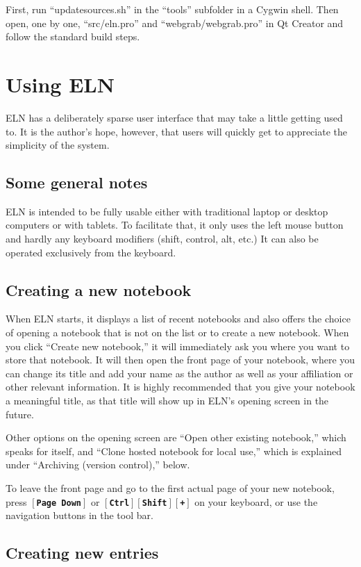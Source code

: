 \documentclass[11pt]{report}
\def\keystroke#1{$\left[\right.\!${\tt\bfseries #1}$\!\left.\right]$}
\def\key#1{\keystroke{#1}}
\def\controlshift#1{\keystroke{Ctrl}\keystroke{Shift}\keystroke{#1}}
\begin{document}
First, run ``updatesources.sh'' in the
``tools'' subfolder in a Cygwin shell. Then open, one by one, ``src/eln.pro''
and ``webgrab/webgrab.pro'' in Qt
Creator and follow the standard build steps.

\chapter{Using ELN}

ELN has a deliberately sparse user interface that may take a little
getting used to. It is the author's hope, however, that users will
quickly get to appreciate the simplicity of the system.

\section{Some general notes}

ELN is intended to be fully usable either with traditional laptop or
desktop computers or with tablets. To facilitate that, it only uses
the left mouse button and hardly any keyboard modifiers (shift,
control, alt, etc.) It can also be operated exclusively from the
keyboard.

\section{Creating a new notebook}

When ELN starts, it displays a list of recent notebooks and also offers the
choice of opening a notebook that is not on the list or to create a
new notebook. When you click ``Create new notebook,'' it will
immediately ask you where you want to store that notebook. It will
then open the front page of your notebook, where you can change its
title and add your name as the author as well as your affiliation or
other relevant information. It is highly recommended that you give
your notebook a meaningful title, as that title will show up in ELN's
opening screen in the future.

Other options on the opening screen are ``Open other existing
notebook,'' which speaks for itself, and ``Clone hosted notebook for
local use,'' which is explained under ``Archiving (version control),''
below.

To leave the front page and go to the first actual page of your new
notebook, press \key{Page Down} or \controlshift{+} on your keyboard,
or use the navigation buttons in the tool bar.

\section{Creating new entries}
\end{document}
